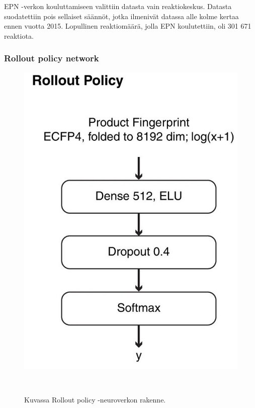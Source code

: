 \documentclass[finnish,twoside,censored,tkt,sw-line]{HYthesisML}
\begin{document}
EPN -verkon kouluttamiseen valittiin datasta vain reaktiokeskus.
Datasta suodatettiin pois sellaiset säännöt, jotka ilmenivät datassa alle kolme kertaa ennen vuotta 2015.
Lopullinen reaktiomäärä, jolla EPN koulutettiin, oli 301 671 reaktiota.

\subsubsection{Rollout policy network}

\begin{figure}
    \centering
    \includegraphics[]{rollout-policy.jpg}
    \caption{Kuvassa Rollout policy -neuroverkon rakenne.}
    {~\cite{SeglerMarwinHS2018Pcsw}}
\end{figure}

\end{document}
